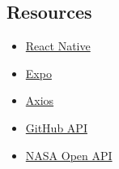 \documentclass{article}
\begin{document}
\subsection*{Resources} 
\begin{itemize}
  \item \href{https://reactnative.dev/}{React Native}
  \item \href{https://expo.io/}{Expo}
  \item \href{https://www.npmjs.com/package/axios}{Axios}
  \item \href{https://developer.github.com/v3/}{GitHub API}
  \item \href{https://api.nasa.gov/}{NASA Open API}
\end{itemize}
 
\end{document}
